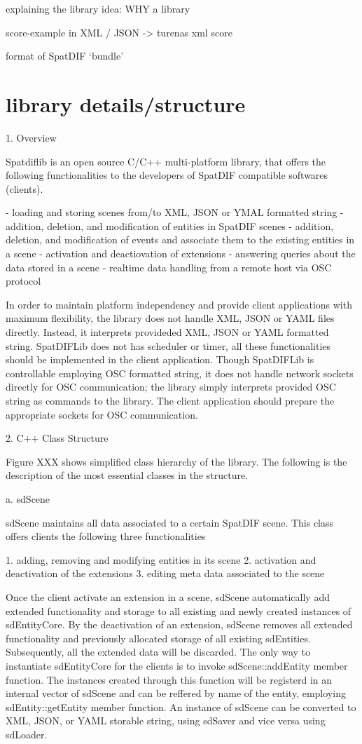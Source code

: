 \documentclass{article}
\begin{document}
explaining the library idea: WHY a library

score-example in XML / JSON -> turenas xml score

format of SpatDIF `bundle'

\section{library details/structure} %
1. Overview

Spatdiflib is an open source C/C++ multi-platform library, that offers the following functionalities to the developers of SpatDIF compatible softwares (clients).

- loading and storing scenes from/to XML, JSON or YMAL formatted string
- addition, deletion, and modification of entities in SpatDIF scenes
- addition, deletion, and modification of events and associate them to the existing entities in a scene
- activation and deactiovation of extensions
- answering queries about the data stored in a scene
- realtime data handling from a remote host via OSC protocol

In order to maintain platform independency and provide client applications with maximum flexibility, the library does not handle XML, JSON or YAML files directly. Instead, it interprets provideded XML, JSON or YAML formatted string.  SpatDIFLib does not has scheduler or timer, all these functionalities should be implemented in the client application. Though SpatDIFLib is controllable employing OSC formatted string, it does not handle network sockets directly for OSC communication; the library simply interprets provided OSC string as commands to the library.  The client application should prepare the appropriate sockets for OSC communication.

2. C++ Class Structure

Figure XXX shows simplified class hierarchy of the library. The following is the description of the most essential classes in the structure.

a. sdScene

sdScene maintains all data associated to a certain SpatDIF scene. This class offers clients the following three functionalities

1. adding, removing and modifying entities in its scene
2. activation and deactivation of the extensions
3. editing meta data associated to the scene

Once the client activate an extension in a scene, sdScene automatically add extended functionality and storage to all existing and newly created instances of sdEntityCore. By the deactivation of an extension, sdScene removes all extended functionality and previously allocated storage of all existing sdEntities. Subsequently, all the extended data will be discarded.
The only way to instantiate sdEntityCore for the clients is to invoke sdScene::addEntity member function. The instances created through this function will be registerd in an internal vector
of sdScene and  can be reffered by name of the entity, employing sdEntity::getEntity member function. An instance of sdScene can be converted to XML, JSON, or YAML storable string, using sdSaver and vice versa using sdLoader.
\end{document}
